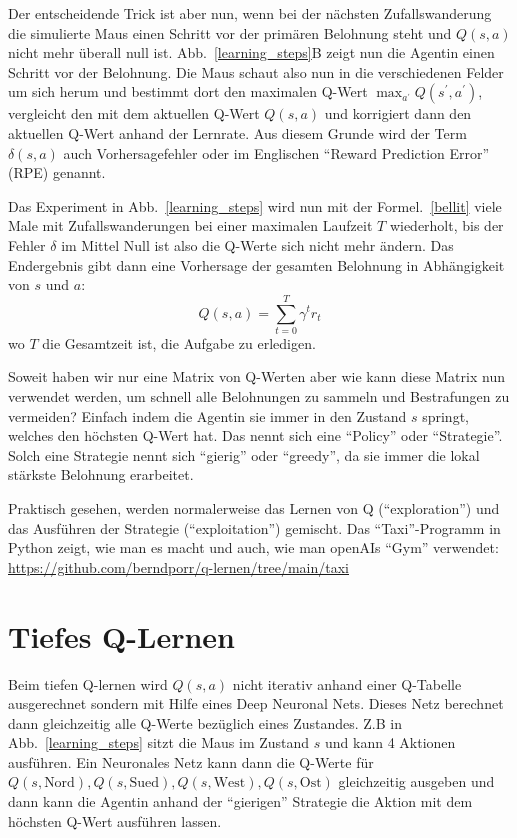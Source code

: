 \documentclass[12pt]{article}
\begin{document}
Der entscheidende Trick ist aber nun, wenn bei der nächsten
Zufallswanderung die simulierte Maus einen Schritt vor der primären
Belohnung steht und $Q(s,a)$ nicht mehr überall null
ist. Abb.~\ref{learning_steps}B zeigt nun die Agentin einen Schritt
vor der Belohnung. Die Maus schaut also nun in die verschiedenen
Felder um sich herum und bestimmt dort den maximalen Q-Wert
$\max_{a^\prime} Q(s^\prime,a^\prime)$, vergleicht den mit dem
aktuellen Q-Wert $Q(s,a)$ und korrigiert dann den aktuellen Q-Wert
anhand der Lernrate. Aus diesem Grunde wird der Term $\delta(s,a)$
auch Vorhersagefehler oder im Englischen ``Reward Prediction Error''
(RPE) genannt.

Das Experiment in Abb.~\ref{learning_steps} wird nun mit der
Formel.~\ref{bellit} viele Male mit Zufallswanderungen bei einer
maximalen Laufzeit $T$ wiederholt, bis der Fehler $\delta$ im Mittel
Null ist also die Q-Werte sich nicht mehr ändern. Das Endergebnis gibt
dann eine Vorhersage der gesamten Belohnung in Abhängigkeit von $s$
und $a$:
\begin{equation}
  Q(s,a) = \sum_{t=0}^T \gamma^t r_t
\end{equation}
wo $T$ die Gesamtzeit ist, die Aufgabe zu erledigen.

Soweit haben wir nur eine Matrix von Q-Werten aber wie kann diese
Matrix nun verwendet werden, um schnell alle Belohnungen zu sammeln
und Bestrafungen zu vermeiden? Einfach indem die Agentin sie immer in
den Zustand $s$ springt, welches den höchsten Q-Wert hat. Das nennt
sich eine ``Policy'' oder ``Strategie''. Solch eine Strategie
nennt sich ``gierig'' oder ``greedy'', da sie immer die lokal stärkste
Belohnung erarbeitet.

Praktisch gesehen, werden normalerweise das Lernen von Q
(``exploration'') und das Ausführen der Strategie (``exploitation'')
gemischt. Das ``Taxi''-Programm in Python zeigt, wie man es macht
und auch, wie man openAIs ``Gym'' verwendet:
\url{https://github.com/berndporr/q-lernen/tree/main/taxi}

\section{Tiefes Q-Lernen}
Beim tiefen Q-lernen wird $Q(s,a)$ nicht iterativ anhand einer Q-Tabelle
ausgerechnet sondern mit Hilfe eines Deep Neuronal Nets. Dieses Netz
berechnet dann gleichzeitig alle Q-Werte bezüglich eines
Zustandes. Z.B in Abb.~\ref{learning_steps} sitzt die Maus im Zustand
$s$ und kann 4 Aktionen ausführen. Ein Neuronales Netz kann dann die
Q-Werte für $Q(s,\textrm{Nord}), Q(s,\textrm{Sued}),
Q(s,\textrm{West}), Q(s,\textrm{Ost})$ gleichzeitig ausgeben und dann
kann die Agentin anhand der ``gierigen'' Strategie die Aktion mit dem
höchsten Q-Wert ausführen lassen.
\end{document}
